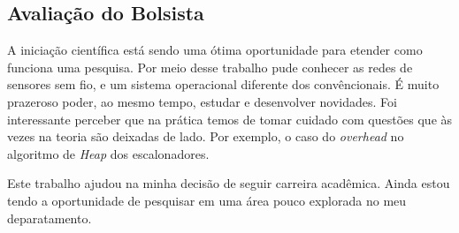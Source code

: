 \documentclass[a4paper,onecolumn, 10pt]{article}
\begin{document}
\subsection{Avaliação do Bolsista}
A iniciação científica está sendo uma ótima oportunidade para etender como funciona uma pesquisa. Por meio desse trabalho pude conhecer as redes de sensores sem fio, e um sistema operacional diferente dos convêncionais. É muito prazeroso poder, ao mesmo tempo, estudar e desenvolver novidades. Foi interessante perceber que na prática temos de tomar cuidado com questões que às vezes na teoria são deixadas de lado. Por exemplo, o caso do \textit{overhead} no algoritmo de \textit{Heap} dos escalonadores. 

Este trabalho ajudou na minha decisão de seguir carreira acadêmica. Ainda estou tendo a oportunidade de pesquisar em uma área pouco explorada no meu deparatamento.

%


\end{document}
